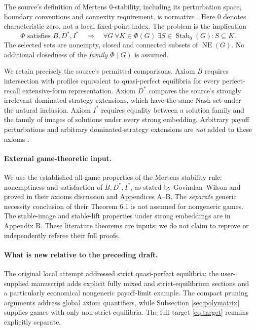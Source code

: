 \documentclass[11pt]{article}
\theoremstyle{definition}
\newcommand{\NE}{\operatorname{NE}}
\newcommand{\Stab}{\operatorname{Stab}_0}
\begin{document}
The source's definition of Mertens $0$-stability, including its perturbation
space, boundary conventions and connexity requirement, is normative
\cite[Definition 2.4]{gw}. Here $0$ denotes characteristic zero, not a local
fixed-point index. The problem is the implication
\begin{equation}\label{eq:target}
 \Phi\text{ satisfies }B,D^*,I^*
 \quad\Longrightarrow\quad
 \forall G\ \forall K\in\Phi(G)\ \exists S\in\Stab(G): S\subseteq K.
\end{equation}
The selected sets are nonempty, closed and connected subsets of $\NE(G)$.
No additional closedness of the \emph{family} $\Phi(G)$ is assumed.

We retain precisely the source's permitted comparisons. Axiom $B$ requires
intersection with profiles equivalent to quasi-perfect equilibria for every
perfect-recall extensive-form representation. Axiom $D^*$ compares the source's
strongly irrelevant dominated-strategy extensions, which have the same Nash
set under the natural inclusion. Axiom $I^*$ requires equality between a
solution family and the family of images of solutions under every strong
embedding. Arbitrary payoff perturbations and arbitrary dominated-strategy
extensions are \emph{not} added to these axioms
\cite[Axioms 3.1, 4.7, 5.4; Definitions 4.4, 5.2]{gw}.

\paragraph{External game-theoretic input.}
We use the established all-game properties of the Mertens stability
rule: nonemptiness and satisfaction of $B,D^*,I^*$, as stated by
Govindan--Wilson and proved in their axioms discussion and Appendices A--B.
The \emph{separate} generic necessity conclusion of their Theorem 6.1
is not assumed for nongeneric games. The stable-image and stable-lift
properties under strong embeddings are in Appendix B. These literature theorems are inputs;
we do not claim to reprove or independently referee their full proofs.

\paragraph{What is new relative to the preceding draft.}
The original local attempt addressed strict quasi-perfect equilibria; the
user-supplied manuscript adds explicit fully mixed and strict-equilibrium
sections and a particularly economical nongeneric payoff-limit example.
The compact pruning arguments address global axiom quantifiers, while
Subsection \ref{sec:polymatrix} supplies games with only non-strict equilibria.
The full target \eqref{eq:target} remains explicitly separate.
\end{document}
